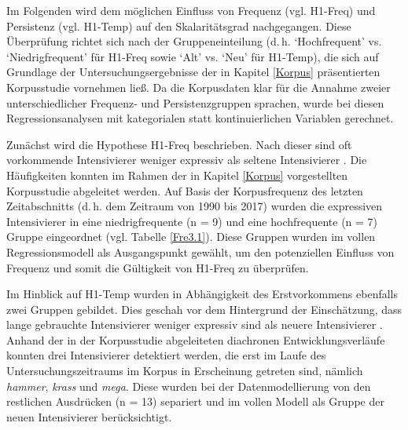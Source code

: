 Im Folgenden wird dem möglichen Einfluss von Frequenz (vgl. H1-Freq) und Persistenz (vgl. H1-Temp) auf den Skalaritätsgrad nachgegangen. Diese Überprüfung richtet sich nach der Gruppeneinteilung (d.\,h. `Hochfrequent' vs. `Niedrigfrequent' für H1-Freq sowie `Alt' vs. `Neu' für {H1-Temp}), die sich auf Grundlage der Untersuchungsergebnisse der in Kapitel \ref{Korpus} präsentierten Korpusstudie vornehmen ließ. Da die Korpusdaten klar für die Annahme zweier unterschiedlicher Frequenz- und Persistenzgruppen sprachen, wurde bei diesen Regressionsanalysen mit kategorialen statt kontinuierlichen Variablen gerechnet.


Zunächst wird die Hypothese H1-Freq beschrieben. Nach dieser sind oft vorkommende Intensivierer weniger expressiv als seltene Intensivierer \citep[vgl.][2]{Hauschild.1899}. Die Häufigkeiten konnten im Rahmen der in Kapitel \ref{Korpus} vorgestellten Korpusstudie abgeleitet werden. Auf Basis der Korpusfrequenz des letzten Zeitabschnitts (d.\,h. dem Zeitraum von 1990 bis 2017) wurden die expressiven Intensivierer in eine niedrigfrequente (n = 9) und eine hochfrequente {(n = 7)} Gruppe eingeordnet (vgl. Tabelle \ref{Fre3.1}). Diese Gruppen wurden im vollen Regressionsmodell als Ausgangspunkt gewählt, um den potenziellen Einfluss von Frequenz und somit die Gültigkeit von H1-Freq zu überprüfen.


Im Hinblick auf H1-Temp wurden in Abhängigkeit des Erstvorkommens ebenfalls zwei Gruppen gebildet. Dies geschah vor dem Hintergrund der Einschätzung, dass lange gebrauchte Intensivierer weniger expressiv sind als neuere Intensivierer \citep[vgl.][59]{Tobler.1868}. Anhand der in der Korpusstudie abgeleiteten diachronen Entwicklungsverläufe konnten drei Intensivierer detektiert werden, die erst im Laufe des Untersuchungszeitraums im Korpus in Erscheinung getreten sind, nämlich \textit{hammer}, \textit{krass} und \textit{mega}. Diese wurden bei der Datenmodellierung von den restlichen Ausdrücken (n = 13) separiert und im vollen Modell als Gruppe der neuen Intensivierer berücksichtigt.


